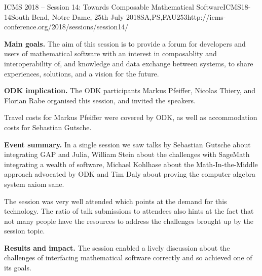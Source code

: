 \begin{event}{ICMS 2018 -- Session 14: Towards Composable Mathematical Software}{ICMS18-14}{South Bend, Notre Dame, 25th July 2018}{SA,PS,FAU}{25}{3}{http://icms-conference.org/2018/sessions/session14/}

\textbf{Main goals.} The aim of this session is to provide a forum for
developers and users of mathematical software with an interest in composablity
and interoperability of, and knowledge and data exchange between systems, to
share experiences, solutions, and a vision for the future.

\textbf{ODK implication.} The ODK participants Markus Pfeiffer, Nicolas Thiery,
and Florian Rabe organised this session, and invited the speakers.

Travel costs for Markus Pfeiffer were covered by ODK, as well as accommodation
costs for Sebastian Gutsche.

\textbf{Event summary.} In a single session we saw talks by Sebastian Gutsche
about integrating GAP and Julia, William Stein about the challenges with
SageMath integrating a wealth of software, Michael Kohlhase about the
Math-In-the-Middle approach advocated by ODK and Tim Daly about proving the
computer algebra system axiom sane.

The session was very well attended which points at the demand for this
technology. The ratio of talk submissions to attendees also hints at the fact
that not many people have the resources to address the challenges brought up by
the session topic.

\textbf{Results and impact.} The session enabled a lively discussion about the
challenges of interfacing mathematical software correctly and so achieved one of
its goals.

\end{event}
